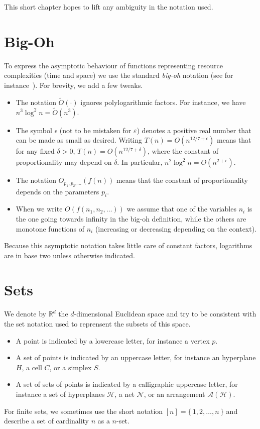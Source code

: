 
This short chapter hopes to lift any ambiguity in the notation used.

\section*{Big-Oh}

To express the asymptotic behaviour of functions representing resource
complexities (time and space) we use the standard \emph{big-oh} notation
(see for instance~\cite[Chapter~3]{CLRS09}). For brevity, we add a few
tweaks.

\begin{itemize}

\item The notation $\tilde{O}(\cdot)$ ignores polylogarithmic factors. For
	instance, we have
	\(n^3 \log^2 n = \tilde{O}(n^3)\).

\item The symbol $\epsilon$ (not to be mistaken for \(\varepsilon\))
	denotes a positive real number that can be made as small as desired.
	Writing \(T(n) = O(n^{12/7 + \epsilon})\) means that for any fixed
	\(\delta > 0\), \(T(n) = O(n^{12/7 + \delta})\), where the constant of
	proportionality may depend on \(\delta\).
	In particular, \(n^2 \log^2 n = O(n^{2 + \epsilon})\).

\item The notation \(O_{p_1,p_2, \ldots}(f(n))\) means that the constant of
	proportionality depends on the parameters \(p_i\).

\item When we write \(O(f(n_1,n_2, \ldots))\) we assume that one of the variables
	\(n_i\) is the one going towards infinity in the big-oh definition, while the
	others are monotone functions of \(n_i\) (increasing or decreasing
	depending on the context).

\end{itemize}

Because this asymptotic notation takes little care of constant factors,
logarithms are in base two unless otherwise indicated.

\section*{Sets}

We denote by \(\mathbb{R}^d\) the \(d\)-dimensional Euclidean space
and try to be consistent with the set notation used to reprensent the subsets
of this space.
\begin{itemize}
	\item A point is indicated by a lowercase letter, for instance a vertex \(p\).
	\item A set of points is indicated by an uppercase letter, for instance an
		hyperplane \(H\), a cell \(C\), or a simplex \(S\).
	\item A set of sets of points is indicated by a calligraphic uppercase
		letter, for instance
		a set of hyperplanes \(\mathcal{H}\),
		a net \(\mathcal{N}\), or an arrangement \(\mathcal{A}(\mathcal{H})\).
\end{itemize}

For finite sets,
we sometimes use the short notation \([n] = \{\,1,2,\ldots ,n\,\}\) and
describe a set of cardinality \(n\) as a \(n\)-set.

